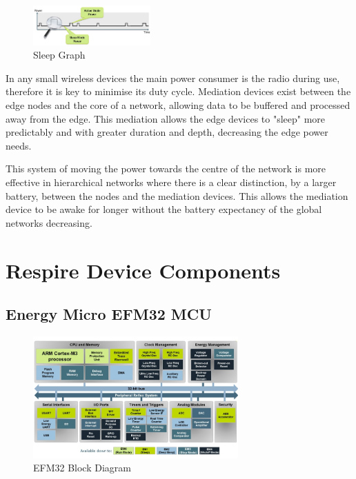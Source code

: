 \begin{figure}
  \vspace{-10pt}
  \begin{center}
    \includegraphics[width=0.4\textwidth, keepaspectratio=true]{images/lowenergysystemsoverview_croped.jpg}
  \end{center}
  \caption[Sleep Graph]{Sleep Graph \cite{EFM32Tech}}
  \vspace{-10pt}
\end{figure}

In any small wireless devices the main power consumer is the radio during use, therefore it is key to
minimise its duty cycle. Mediation devices exist between the edge nodes and the core of a network,
allowing data to be buffered and processed away from the edge. This mediation allows the edge
devices to "sleep" more predictably and with greater duration and depth, decreasing the edge
power needs\cite{Sapio & Tsouri, 2010, Edgar2003}. %


This system of moving the power towards the centre of the network is more effective in hierarchical networks
where there is a clear distinction, \eg by a larger battery, between the nodes
and the mediation devices. This allows the mediation device to be awake for
longer without the battery expectancy of the global networks decreasing.

\section{Respire Device Components}

\subsection{Energy Micro EFM32 \ac{MCU}}

\begin{figure}
  \vspace{-10pt}
  \begin{center}
    \includegraphics[width=0.7\textwidth, keepaspectratio=true]{images/efm32_block_croped.jpg}
  \end{center}
  \caption[EFM32 Block Diagram]{EFM32 Block Diagram \cite{EFM32Tech}}
  \vspace{-10pt}
\end{figure}

